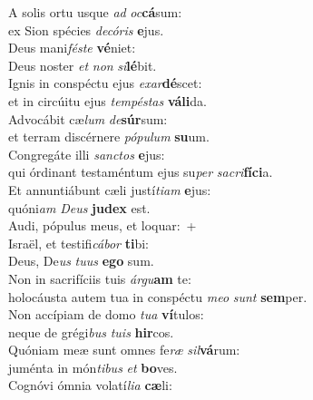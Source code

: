 \evenverse A solis ortu usque \textit{ad} \textit{oc}\textbf{cá}sum:~\*\\
\evenverse ex Sion spécies \textit{de}\textit{có}\textit{ris} \textbf{e}jus.\\
\oddverse Deus mani\textit{fé}\textit{ste} \textbf{vé}niet:~\*\\
\oddverse Deus noster \textit{et} \textit{non} \textit{si}\textbf{lé}bit.\\
\evenverse Ignis in conspéctu ejus \textit{e}\textit{xar}\textbf{dé}scet:~\*\\
\evenverse et in circúitu ejus \textit{tem}\textit{pé}\textit{stas} \textbf{vá}\textbf{li}da.\\
\oddverse Advocábit cæ\textit{lum} \textit{de}\textbf{súr}sum:~\*\\
\oddverse et terram discérnere \textit{pó}\textit{pu}\textit{lum} \textbf{su}um.\\
\evenverse Congregáte illi \textit{san}\textit{ctos} \textbf{e}jus:~\*\\
\evenverse qui órdinant testaméntum ejus su\textit{per} \textit{sa}\textit{cri}\textbf{fí}\textbf{ci}a.\\
\oddverse Et annuntiábunt cæli justí\textit{ti}\textit{am} \textbf{e}jus:~\*\\
\oddverse quóni\textit{am} \textit{De}\textit{us} \textbf{ju}\textbf{dex} est.\\
\evenverse Audi, pópulus meus, et loquar:~+\\
\evenverse  Israël, et testifi\textit{cá}\textit{bor} \textbf{ti}bi:~\*\\
\evenverse Deus, De\textit{us} \textit{tu}\textit{us} \textbf{e}\textbf{go} sum.\\
\oddverse Non in sacrifíciis tuis \textit{ár}\textit{gu}\textbf{am} te:~\*\\
\oddverse holocáusta autem tua in conspéctu \textit{me}\textit{o} \textit{sunt} \textbf{sem}per.\\
\evenverse Non accípiam de domo \textit{tu}\textit{a} \textbf{ví}tulos:~\*\\
\evenverse neque de grégi\textit{bus} \textit{tu}\textit{is} \textbf{hir}cos.\\
\oddverse Quóniam meæ sunt omnes fe\textit{ræ} \textit{sil}\textbf{vá}rum:~\*\\
\oddverse juménta in món\textit{ti}\textit{bus} \textit{et} \textbf{bo}ves.\\
\evenverse Cognóvi ómnia volatí\textit{li}\textit{a} \textbf{cæ}li:~\*\\

